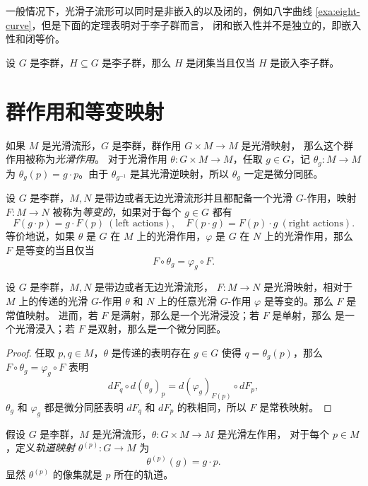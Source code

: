 \documentclass[fontset=none]{Notes}
\begin{document}
一般情况下，光滑子流形可以同时是非嵌入的以及闭的，例如八字曲线
\ref{exa:eight-curve}，但是下面的定理表明对于李子群而言，
闭和嵌入性并不是独立的，即嵌入性和闭等价。

\begin{theorem}
  设 $G$ 是李群，$H\subseteq G$ 是李子群，那么 $H$ 是闭集当且仅当
  $H$ 是嵌入李子群。
\end{theorem}

\section{群作用和等变映射}

如果 $M$ 是光滑流形，$G$ 是李群，群作用 $G\times M\to M$ 是光滑映射，
那么这个群作用被称为\emph{光滑作用}。
对于光滑作用 $\theta:G\times M\to M$，任取 $g\in G$，记 
$\theta_g:M\to M$ 为 $\theta_g(p)=g\cdot p$。由于 $\theta_{g^{-1}}$
是其光滑逆映射，所以 $\theta_g$ 一定是微分同胚。

设 $G$ 是李群，$M,N$ 是带边或者无边光滑流形并且都配备一个光滑
$G$-作用，映射 $F:M\to N$ 被称为\emph{等变的}，如果对于每个 $g\in G$
都有
\[
  F(g\cdot p)=g\cdot F(p) \ (\text{left actions})  ,\quad
  F(p\cdot g)=F(p)\cdot g \ (\text{right actions})  .
\]
等价地说，如果 $\theta$ 是 $G$ 在 $M$ 上的光滑作用，$\varphi$
是 $G$ 在 $N$ 上的光滑作用，那么 $F$ 是等变的当且仅当
\[
  F\circ \theta_g=\varphi_g\circ F.  
\]

\begin{theorem}[等变秩定理]
  设 $G$ 是李群，$M,N$ 是带边或者无边光滑流形，
  $F:M\to N$ 是光滑映射，相对于 $M$ 上的传递的光滑 $G$-作用 $\theta$ 和
  $N$ 上的任意光滑 $G$-作用 $\varphi$ 是等变的。那么 $F$ 是常值映射。
  进而，若 $F$ 是满射，那么是一个光滑浸没；若 $F$ 是单射，那么
  是一个光滑浸入；若 $F$ 是双射，那么是一个微分同胚。
\end{theorem}
\begin{proof}
  任取 $p,q\in M$，$\theta$ 是传递的表明存在 $g\in G$ 使得
  $q=\theta_g(p)$，那么 $F\circ\theta_g=\varphi_g\circ F$ 表明
  \[
    dF_{q}\circ d(\theta_g)_p=d(\varphi_g)_{F(p)}\circ dF_p,  
  \]
  $\theta_g$ 和 $\varphi_g$ 都是微分同胚表明 $dF_q$ 和 $dF_p$
  的秩相同，所以 $F$ 是常秩映射。
\end{proof}

假设 $G$ 是李群，$M$ 是光滑流形，$\theta:G\times M\to M$ 是光滑左作用，
对于每个 $p\in M$，定义\emph{轨道映射} $\theta^{(p)}:G\to M$ 为
\[
  \theta^{(p)}(g)=g\cdot p.  
\]
显然 $\theta^{(p)}$ 的像集就是 $p$ 所在的轨道。
\end{document}
